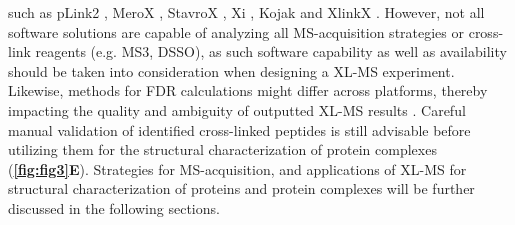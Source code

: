 such as pLink2 \cite{Chen_2019b}, MeroX \cite{Gotze_2015}, StavroX \cite{Gotze_2012}, Xi \cite{Chen_2019a}, Kojak \cite{Hoopmann_2015} and XlinkX \cite{Klykov_2018}. However, not all software solutions are capable of analyzing all MS-acquisition strategies or cross-link reagents (e.g. MS3, DSSO), as such software capability as well as availability should be taken into consideration when designing a XL-MS experiment. Likewise, methods for FDR calculations might differ across platforms, thereby impacting the quality and ambiguity of outputted XL-MS results \cite{Matzinger_2022}. Careful manual validation of identified cross-linked peptides is still advisable before utilizing them for the structural characterization of protein complexes (\textbf{\autoref{fig:fig3}E}). Strategies for MS-acquisition, and applications of XL-MS for structural characterization of proteins and protein complexes will be further discussed in the following sections.
%
